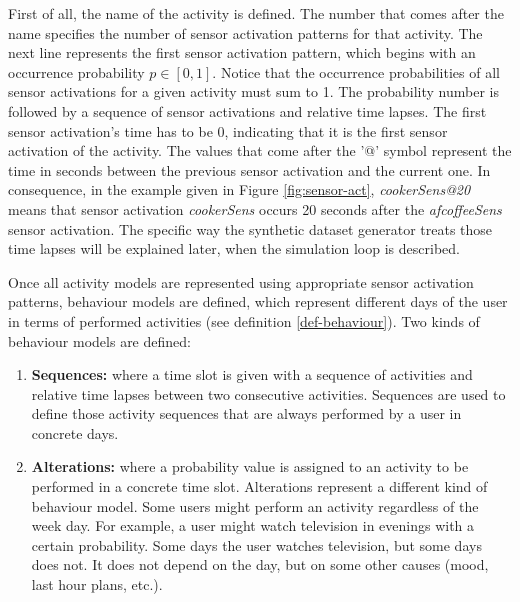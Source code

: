 First of all, the name of the activity is defined. The number that comes after the name specifies the number of sensor activation patterns for that activity. The next line represents the first sensor activation pattern, which begins with an occurrence probability $p \in [0, 1]$. Notice that the occurrence probabilities of all sensor activations for a given activity must sum to 1. The probability number is followed by a sequence of sensor activations and relative time lapses. The first sensor activation's time has to be 0, indicating that it is the first sensor activation of the activity. The values that come after the '@' symbol represent the time in seconds between the previous sensor activation and the current one. In consequence, in the example given in Figure \ref{fig:sensor-act}, \textit{cookerSens@20} means that sensor activation \textit{cookerSens} occurs 20 seconds after the \textit{afcoffeeSens} sensor activation. The specific way the synthetic dataset generator treats those time lapses will be explained later, when the simulation loop is described.

Once all activity models are represented using appropriate sensor activation patterns, behaviour models are defined, which represent different days of the user in terms of performed activities (see definition \ref{def-behaviour}). Two kinds of behaviour models are defined: 

\begin{enumerate}
 \item \textbf{Sequences:} where a time slot is given with a sequence of activities and relative time lapses between two consecutive activities. Sequences are used to define those activity sequences that are always performed by a user in concrete days.
 \item \textbf{Alterations:} where a probability value is assigned to an activity to be performed in a concrete time slot. Alterations represent a different kind of behaviour model. Some users might perform an activity regardless of the week day. For example, a user might watch television in evenings with a certain probability. Some days the user watches television, but some days does not. It does not depend on the day, but on some other causes (mood, last hour plans, etc.).
\end{enumerate}

